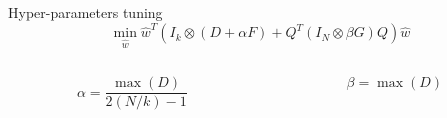 	\begin{frame}{Hyper-parameters tuning}
		$$\min _{\hat{w}} \hat{w}^{T}\left(I_{k} \otimes(D+\alpha F)+Q^{T}\left(I_{N} \otimes \beta G\right) Q\right) \hat{w}$$
		\bigbreak
		\begin{columns}
			\begin{column}{0.5\textwidth}
				$$\alpha=\frac{\max (D)}{2(N / k)-1}$$
			\end{column}
			\begin{column}{0.5\textwidth}  
				$$\beta=\max (D)$$
			\end{column}
		\end{columns}
		
	\end{frame}





